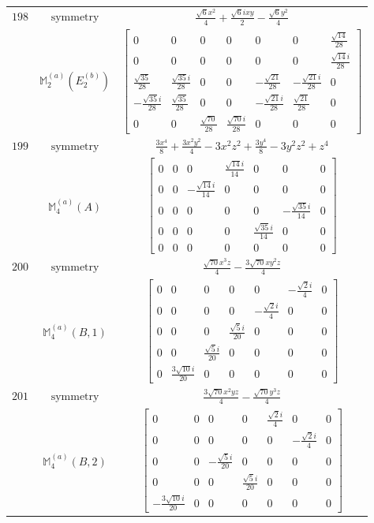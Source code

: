 \documentclass[fleqn,8pt,landscape]{jsarticle}
\begin{document}
\begin{longtable}{ccc}
$ 198 $ & $ \text{symmetry} $ & $ \frac{\sqrt{6} x^{2}}{4} + \frac{\sqrt{6} i x y}{2} - \frac{\sqrt{6} y^{2}}{4} $ \\
$  $ & $ \mathbb{M}_{2}^{(a)}(E_{2}^{(b)}) $ & $ \begin{bmatrix} 0 & 0 & 0 & 0 & 0 & 0 & \frac{\sqrt{14}}{28} \\ 0 & 0 & 0 & 0 & 0 & 0 & \frac{\sqrt{14} i}{28} \\ \frac{\sqrt{35}}{28} & \frac{\sqrt{35} i}{28} & 0 & 0 & - \frac{\sqrt{21}}{28} & - \frac{\sqrt{21} i}{28} & 0 \\ - \frac{\sqrt{35} i}{28} & \frac{\sqrt{35}}{28} & 0 & 0 & - \frac{\sqrt{21} i}{28} & \frac{\sqrt{21}}{28} & 0 \\ 0 & 0 & \frac{\sqrt{70}}{28} & \frac{\sqrt{70} i}{28} & 0 & 0 & 0 \end{bmatrix} $ \\ \hline
$ 199 $ & $ \text{symmetry} $ & $ \frac{3 x^{4}}{8} + \frac{3 x^{2} y^{2}}{4} - 3 x^{2} z^{2} + \frac{3 y^{4}}{8} - 3 y^{2} z^{2} + z^{4} $ \\
$  $ & $ \mathbb{M}_{4}^{(a)}(A) $ & $ \begin{bmatrix} 0 & 0 & 0 & \frac{\sqrt{14} i}{14} & 0 & 0 & 0 \\ 0 & 0 & - \frac{\sqrt{14} i}{14} & 0 & 0 & 0 & 0 \\ 0 & 0 & 0 & 0 & 0 & - \frac{\sqrt{35} i}{14} & 0 \\ 0 & 0 & 0 & 0 & \frac{\sqrt{35} i}{14} & 0 & 0 \\ 0 & 0 & 0 & 0 & 0 & 0 & 0 \end{bmatrix} $ \\ \hline
$ 200 $ & $ \text{symmetry} $ & $ \frac{\sqrt{70} x^{3} z}{4} - \frac{3 \sqrt{70} x y^{2} z}{4} $ \\
$  $ & $ \mathbb{M}_{4}^{(a)}(B,1) $ & $ \begin{bmatrix} 0 & 0 & 0 & 0 & 0 & - \frac{\sqrt{2} i}{4} & 0 \\ 0 & 0 & 0 & 0 & - \frac{\sqrt{2} i}{4} & 0 & 0 \\ 0 & 0 & 0 & \frac{\sqrt{5} i}{20} & 0 & 0 & 0 \\ 0 & 0 & \frac{\sqrt{5} i}{20} & 0 & 0 & 0 & 0 \\ 0 & \frac{3 \sqrt{10} i}{20} & 0 & 0 & 0 & 0 & 0 \end{bmatrix} $ \\ \hline
$ 201 $ & $ \text{symmetry} $ & $ \frac{3 \sqrt{70} x^{2} y z}{4} - \frac{\sqrt{70} y^{3} z}{4} $ \\
$  $ & $ \mathbb{M}_{4}^{(a)}(B,2) $ & $ \begin{bmatrix} 0 & 0 & 0 & 0 & \frac{\sqrt{2} i}{4} & 0 & 0 \\ 0 & 0 & 0 & 0 & 0 & - \frac{\sqrt{2} i}{4} & 0 \\ 0 & 0 & - \frac{\sqrt{5} i}{20} & 0 & 0 & 0 & 0 \\ 0 & 0 & 0 & \frac{\sqrt{5} i}{20} & 0 & 0 & 0 \\ - \frac{3 \sqrt{10} i}{20} & 0 & 0 & 0 & 0 & 0 & 0 \end{bmatrix} $ \\ \hline

\end{longtable}
\end{document}

